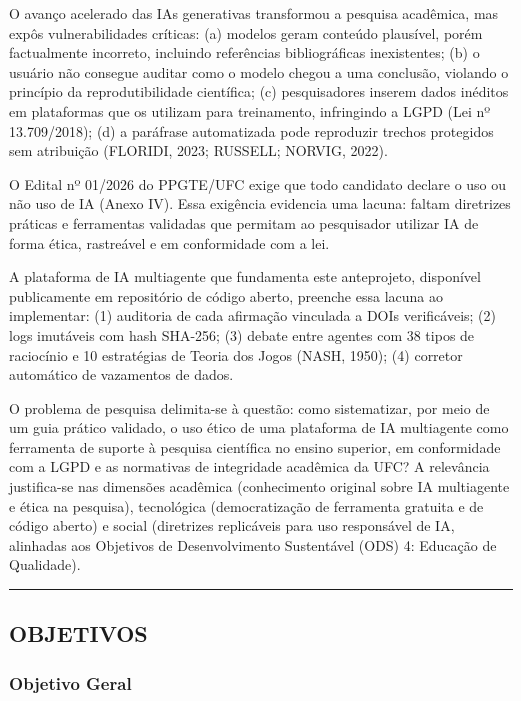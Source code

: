 \documentclass[
  brazilian,
  12pt,
]{article}
\begin{document}
O avanço acelerado das IAs generativas transformou a pesquisa acadêmica,
mas expôs vulnerabilidades críticas: (a) modelos geram conteúdo
plausível, porém factualmente incorreto, incluindo referências
bibliográficas inexistentes; (b) o usuário não consegue auditar como o
modelo chegou a uma conclusão, violando o princípio da reprodutibilidade
científica; (c) pesquisadores inserem dados inéditos em plataformas que
os utilizam para treinamento, infringindo a LGPD (Lei nº 13.709/2018);
(d) a paráfrase automatizada pode reproduzir trechos protegidos sem
atribuição (FLORIDI, 2023; RUSSELL; NORVIG, 2022).

O Edital nº 01/2026 do PPGTE/UFC exige que todo candidato declare o uso
ou não uso de IA (Anexo IV). Essa exigência evidencia uma lacuna: faltam
diretrizes práticas e ferramentas validadas que permitam ao pesquisador
utilizar IA de forma ética, rastreável e em conformidade com a lei.

A plataforma de IA multiagente que fundamenta este anteprojeto,
disponível publicamente em repositório de código aberto, preenche essa
lacuna ao implementar: (1) auditoria de cada afirmação vinculada a DOIs
verificáveis; (2) logs imutáveis com hash SHA-256; (3) debate entre
agentes com 38 tipos de raciocínio e 10 estratégias de Teoria dos Jogos
(NASH, 1950); (4) corretor automático de vazamentos de dados.

O problema de pesquisa delimita-se à questão: como sistematizar, por
meio de um guia prático validado, o uso ético de uma plataforma de IA
multiagente como ferramenta de suporte à pesquisa científica no ensino
superior, em conformidade com a LGPD e as normativas de integridade
acadêmica da UFC? A relevância justifica-se nas dimensões acadêmica
(conhecimento original sobre IA multiagente e ética na pesquisa),
tecnológica (democratização de ferramenta gratuita e de código aberto) e
social (diretrizes replicáveis para uso responsável de IA, alinhadas aos
Objetivos de Desenvolvimento Sustentável (ODS) 4: Educação de
Qualidade).

\begin{center}\rule{0.5\linewidth}{0.5pt}\end{center}

\subsection{OBJETIVOS}\label{objetivos}

\subsubsection{Objetivo Geral}\label{objetivo-geral}
\end{document}
